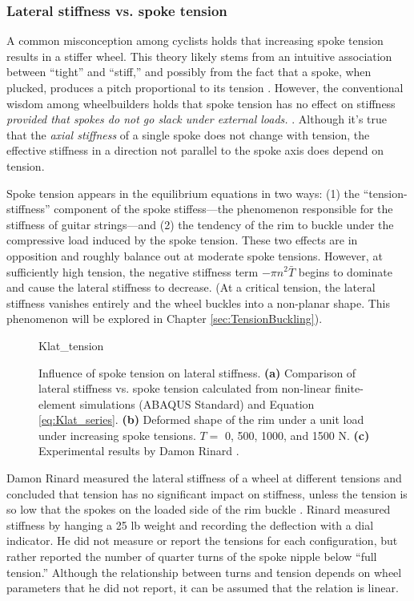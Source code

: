 \documentclass[\rootdir/thesis.tex]{subfiles}
\begin{document}
\subsubsection{Lateral stiffness vs. spoke tension}

A common misconception among cyclists holds that increasing spoke tension results in a stiffer wheel. This theory likely stems from an intuitive association between ``tight'' and ``stiff,'' and possibly from the fact that a spoke, when plucked, produces a pitch proportional to its tension \cite{JohnAllen}. However, the conventional wisdom among wheelbuilders holds that spoke tension has no effect on stiffness \emph{provided that spokes do not go slack under external loads.} \cite{Rinard,SlowTwitch,WheelFanatyk}. Although it's true that the \emph{axial stiffness} of a single spoke does not change with tension, the effective stiffness in a direction not parallel to the spoke axis does depend on tension.

Spoke tension appears in the equilibrium equations in two ways: (1) the ``tension-stiffness'' component of the spoke stiffess---the phenomenon responsible for the stiffness of guitar strings---and (2) the tendency of the rim to buckle under the compressive load induced by the spoke tension. These two effects are in opposition and roughly balance out at moderate spoke tensions. However, at sufficiently high tension, the negative stiffness term $-\pi n^2 \bar{T}$ begins to dominate and cause the lateral stiffness to decrease. (At a critical tension, the lateral stiffness vanishes entirely and the wheel buckles into a non-planar shape. This phenomenon will be explored in Chapter \ref{sec:TensionBuckling}).

\begin{figure}[h]
\centering
{Klat_tension}
\caption{Influence of spoke tension on lateral stiffness. \textbf{(a)} Comparison of lateral stiffness vs. spoke tension calculated from non-linear finite-element simulations (ABAQUS Standard) and Equation \eqref{eq:Klat_series}. \textbf{(b)} Deformed shape of the rim under a unit load under increasing spoke tensions. $T=\,\,$0, 500, 1000, and 1500 N. \textbf{(c)} Experimental results by Damon Rinard \cite{Rinard}.}
\label{fig:Klat_tension}
\end{figure}

Damon Rinard measured the lateral stiffness of a wheel at different tensions and concluded that tension has no significant impact on stiffness, unless the tension is so low that the spokes on the loaded side of the rim buckle \cite{Rinard}. Rinard measured stiffness by hanging a 25 lb weight and recording the deflection with a dial indicator. He did not measure or report the tensions for each configuration, but rather reported the number of quarter turns of the spoke nipple below ``full tension.'' Although the relationship between turns and tension depends on wheel parameters that he did not report, it can be assumed that the relation is linear.
\end{document}
